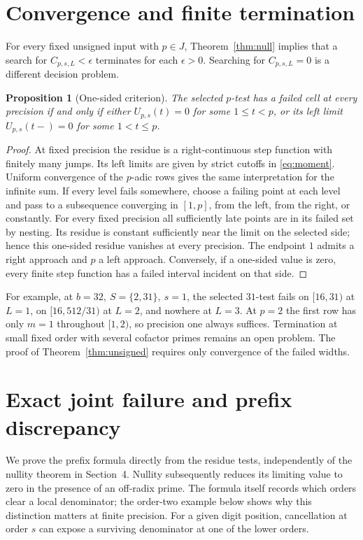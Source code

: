 \documentclass[11pt]{article}
\newtheorem{proposition}[theorem]{Proposition}
\begin{document}
\section{Convergence and finite termination}\label{sec:finite}
For every fixed unsigned input with \(p\in J\), Theorem~\ref{thm:null} implies that a search for \(C_{p,s,L}<\epsilon\) terminates for each \(\epsilon>0\). Searching for \(C_{p,s,L}=0\) is a different decision problem.

\begin{proposition}[One-sided criterion]\label{prop:sides}
The selected \(p\)-test has a failed cell at every precision if and only if either \(U_{p,s}(t)=0\) for some \(1\le t<p\), or its left limit \(U_{p,s}(t-)=0\) for some \(1<t\le p\).
\end{proposition}
\begin{proof}
At fixed precision the residue is a right-continuous step function with finitely many jumps. Its left limits are given by strict cutoffs in \eqref{eq:moment}. Uniform convergence of the \(p\)-adic rows gives the same interpretation for the infinite sum. If every level fails somewhere, choose a failing point at each level and pass to a subsequence converging in \([1,p]\), from the left, from the right, or constantly. For every fixed precision all sufficiently late points are in its failed set by nesting. Its residue is constant sufficiently near the limit on the selected side; hence this one-sided residue vanishes at every precision. The endpoint \(1\) admits a right approach and \(p\) a left approach. Conversely, if a one-sided value is zero, every finite step function has a failed interval incident on that side.
\end{proof}
For example, at \(b=32,\ S=\{2,31\},\ s=1\), the selected \(31\)-test fails on \([16,31)\) at \(L=1\), on \([16,512/31)\) at \(L=2\), and nowhere at \(L=3\). At \(p=2\) the first row has only \(m=1\) throughout \([1,2)\), so precision one always suffices. Termination at small fixed order with several cofactor primes remains an open problem. The proof of Theorem~\ref{thm:unsigned} requires only convergence of the failed widths.

\appendix
\section{Exact joint failure and prefix discrepancy}\label{sec:joint}
We prove the prefix formula directly from the residue tests, independently of the
nullity theorem in Section~4. Nullity subsequently reduces its limiting value to
zero in the presence of an off-radix prime. The formula itself records which
orders clear a local denominator; the order-two example below shows why this
distinction matters at finite precision.
For a given digit position, cancellation at order \(s\) can expose a surviving denominator at one of the lower orders.
\end{document}
